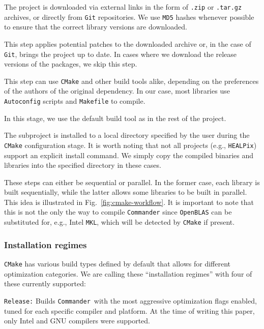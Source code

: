 \documentclass[twocolumn]{openjournal}
\def\commander{\texttt{Commander}}
\begin{document}
 The project is downloaded via external links in the form
of \texttt{.zip} or \texttt{.tar.gz} archives, or directly from \texttt{Git}
repositories. We use \texttt{MD5} hashes whenever possible to ensure that the
correct library versions are downloaded.

 This step applies potential patches to the downloaded
archive or, in the case of \texttt{Git}, brings the project up to date. In
cases where we download the release versions of the packages, we skip this
step.

 This step can use \texttt{CMake} and other build tools
alike, depending on the preferences of the authors of the original dependency.
In our case, most libraries use \texttt{Autoconfig} scripts and
\texttt{Makefile} to compile.

 In this stage, we use the default build tool as in the rest
of the project.

 The subproject is installed to a local directory specified
by the user during the \texttt{CMake} configuration stage. It is worth noting
that not all projects (e.g., \texttt{HEALPix}) support an explicit install
command. We simply copy the compiled binaries and libraries into the specified
directory in these cases.

These steps can either be sequential or parallel. In the former case,  each
library is built sequentially, while the latter allows some libraries to be
built in parallel. This idea is illustrated in  Fig.~\ref{fig:cmake-workflow}.
It is important to note that this is not the only the way to compile \commander
since \texttt{OpenBLAS}  can be substituted for, e.g., Intel \texttt{MKL},
which will be detected by \texttt{CMake} if present. 

\subsubsection{Installation regimes}
\label{cmake-installation-regimes}

\texttt{CMake} has various build types defined by default that allows for
different optimization categories. We are calling these ``installation
regimes'' with four of these currently supported:

\texttt{Release:} Builds \commander\ with the most aggressive optimization
flags enabled, tuned for each specific compiler and platform. At the time of
writing this paper, only Intel and GNU compilers were supported.
\end{document}
